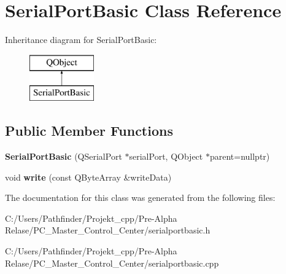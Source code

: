 \hypertarget{class_serial_port_basic}{}\section{Serial\+Port\+Basic Class Reference}
\label{class_serial_port_basic}
Inheritance diagram for Serial\+Port\+Basic\+:\begin{figure}[H]
\begin{center}
\leavevmode
\includegraphics[height=2.000000cm]{class_serial_port_basic}
\end{center}
\end{figure}
\subsection*{Public Member Functions}
\begin{DoxyCompactItemize}
\item 
\mbox{\label{class_serial_port_basic_a02fb531329e9c8d41d2bde788d2b118a}} 
{\bfseries Serial\+Port\+Basic} (Q\+Serial\+Port $\ast$serial\+Port, Q\+Object $\ast$parent=nullptr)
\item 
\mbox{\label{class_serial_port_basic_ac66049064da4a4bbbdbef90b959fef56}} 
void {\bfseries write} (const Q\+Byte\+Array \&write\+Data)
\end{DoxyCompactItemize}


The documentation for this class was generated from the following files\+:\begin{DoxyCompactItemize}
\item 
C\+:/\+Users/\+Pathfinder/\+Projekt\+\_\+cpp/\+Pre-\/\+Alpha Relase/\+P\+C\+\_\+\+Master\+\_\+\+Control\+\_\+\+Center/serialportbasic.\+h\item 
C\+:/\+Users/\+Pathfinder/\+Projekt\+\_\+cpp/\+Pre-\/\+Alpha Relase/\+P\+C\+\_\+\+Master\+\_\+\+Control\+\_\+\+Center/serialportbasic.\+cpp\end{DoxyCompactItemize}
